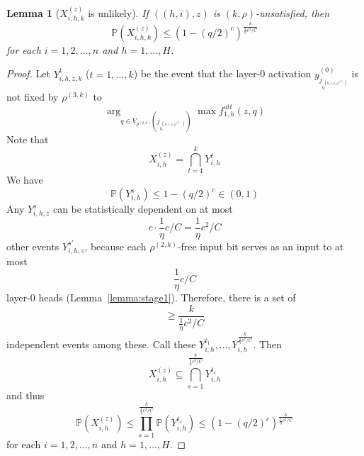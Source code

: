 \documentclass[11pt,letterpaper]{article}
\newcommand{\Prob}[0]{\mathbb{P}}
\newcounter{theorem}
\newtheorem{lemma}[theorem]{Lemma}
\begin{document}
\begin{lemma}[$X_{i,h,k}^{(z)}$ is unlikely]
If $((h,i),z)$ is $(k,\rho)$-unsatisfied, then
\begin{equation}
\Prob(X_{i,h,k}^{(z)}) \leq \left(1-(q/2)^c\right)^{\frac{k}{\frac{1}{\eta}c^2/C}}
\end{equation}
for each $i=1,2,\dots, n$ and $h=1, \dots, H$.
\end{lemma}
\begin{proof}
Let $Y_{i,h,z,k}^t$ ($t=1,\dots,k$) be the event that the layer-0 activation $y_{j_{i_t^{(h,i,z,\rho^{(2)})}}}^{(0)}$ is not fixed by $\rho^{(3,k)}$ to
\begin{equation}
    \arg_{q \in V_{\rho^{(2,k)}}(j_{i_t^{(h,i,z,\rho^{(2)})}})} \max f^{att}_{1,h}(z, q)
\end{equation}
Note that
\begin{equation}
    X_{i,h}^{(z)} = \bigcap_{t=1}^k Y_{i,h}^t
\end{equation}
We have 
\begin{equation}
    \Prob(Y_{i,h}^s) \leq 1-(q/2)^c \in (0,1)
\end{equation} 
Any $Y_{i,h,z}^s$ can be statistically dependent on at most 
\begin{equation}
c \cdot \frac{1}{\eta}c/C = \frac{1}{\eta}c^2/C    
\end{equation}
other events $Y_{i,h,z}^{s'}$, because each $\rho^{(2,k)}$-free input bit serves as an input to at most
\begin{equation}
    \frac{1}{\eta} c/C
\end{equation}
layer-0 heads (Lemma~\ref{lemma:stage1}).
Therefore, there is a set of
\begin{equation}
    \geq \frac{k}{\frac{1}{\eta}c^2/C}
\end{equation} independent events among these.
Call these $Y_{i,h}^{t_1}, \dots, Y_{i,h}^{\frac{k}{\frac{1}{\eta}c^2/C}}$.
Then 
\begin{equation}
    X_{i,h}^{(z)} \subseteq \bigcap_{s=1}^{\frac{k}{\frac{1}{\eta}c^2/C}} Y_{i,h}^{t_s}
\end{equation}
and thus
\begin{equation}
\Prob(X_{i,h}^{(z)}) \leq \prod_{s=1}^{\frac{k}{\frac{1}{\eta}c^2/C}} \Prob(Y_{i,h}^{t_s}) \leq \left(1-(q/2)^c\right)^{\frac{k}{\frac{1}{\eta}c^2/C}}
\end{equation}
for each $i=1,2,\dots, n$ and $h=1, \dots, H$.
\end{proof}
\end{document}
